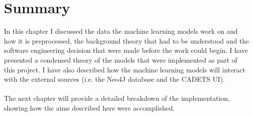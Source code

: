 	\section{Summary}
	In this chapter I discussed the data the machine learning models work on and how it is preprocessed, the background theory that had to be understood and the software engineering decision that were made before the work could begin. I have presented a condensed theory of the models that were implemented as part of this project. I have also described how the machine learning models will interact with the external sources (i.e. the Neo4J database and the CADETS UI).
	\\ \\
	The next chapter will provide a detailed breakdown of the implementation, showing how the aims described here were accomplished. 
	
